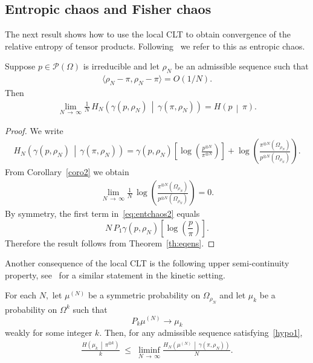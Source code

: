 \documentclass[AHL,Unicode,longabstracts,published]{cedram}
\renewcommand{\leq}{\;\leqslant\;}
\newcommand{\Om}{\Omega}
\newcommand{\scalar}[2]{\langle #1, #2\rangle}
\newcommand{\cP}{\mathcal{P}}
\let\g=\gamma
\let\r=\rho
\let\O=\Omega
\begin{document}
\subsection{Entropic chaos and Fisher chaos} The next result shows how to use the local CLT to obtain convergence of the relative entropy of tensor products. Following~\cite{entfound} we refer to this as entropic chaos.

\begin{prop}\label{th:entchaos}
Suppose $p\in\cP(\O)$ is irreducible and let $\r_N$ be an admissible sequence such that
\begin{align}\label{hypoa1}
\scalar{\r_N-\pi}{\r_N-\pi} =O(1/N).
\end{align}
Then
\begin{align}\label{eq:entchaos}
\lim_{N\,\to\,\infty}
\frac1N\,H_N\left(\g(p,\r_N)\,\middle|\, \g(\pi,\r_N)\right)=H\left(p\,\middle|\,  \pi\right).
\end{align}
\end{prop}
\begin{proof}
We write
\begin{align}\label{eq:entchaos2}
H_N\left(\g(p,\r_N)\,\middle|\, \g(\pi,\r_N)\right)=\g(p,\r_N)\left[\log\left(\frac{p^{\otimes N}}{\pi^{\otimes N}}\right)\right] + \log\left(\frac{\pi^{\otimes N}(\O_{\r_N})}{p^{\otimes N}(\O_{\r_N})}\right).
\end{align}
From Corollary~\ref{coro2} we obtain
\begin{align}\label{eq:entchaos3}
\lim_{N\,\to\,\infty}
\frac1N\, \log\left(\frac{\pi^{\otimes N}(\O_{\r_N})}{p^{\otimes N}(\O_{\r_N})}\right)=0.
\end{align}
By symmetry, the first term in~\eqref{eq:entchaos2} equals
\[
N\,P_1\g(p,\r_N)\left[\log\left(\frac{p}{\pi}\right)\right].
\]
Therefore the result follows from Theorem~\ref{th:eqens}.
\end{proof}

Another consequence of the local CLT is the following upper semi-continuity property, see~\cite{entfound} for a similar statement in the kinetic setting.

\begin{prop}\label{th:entUPSC}
For each $N,$ let $\mu^{(N)}$ be a symmetric probability on $\Om_{\r_N}$ and let $\mu_k$ be a probability on $\Om^k$ such that
\[
P_k\mu^{(N)} \longrightarrow \mu_k
\]
weakly for some integer $k$.
Then, for any admissible sequence satisfying~\eqref{hypo1},
\begin{align}
\frac{H\left(\mu_k\,\middle|\, \pi^{\otimes k}\right)}{k} \leq \liminf_{N\,\to\,\infty}\frac{H_N\left(\mu^{(N)}\,\middle|\,\gamma(\pi,\r_N)\right)}{N}.
\end{align}
\end{prop}
\end{document}
